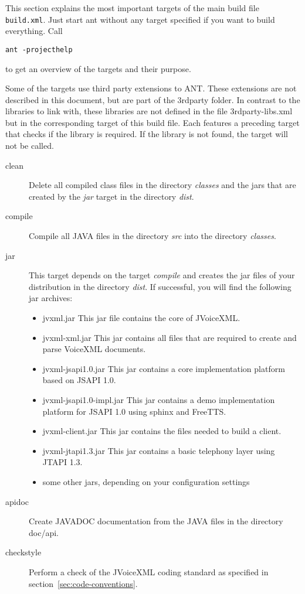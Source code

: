 \documentclass[11pt,a4paper]{article}
\begin{document}
This section explains the most important targets of the main build file
\texttt{build.xml}. Just start ant without any target specified if you want to
build everything. Call 
\begin{lstlisting}
ant -projecthelp
\end{lstlisting}
to get an overview of the targets and their purpose.

Some of the targets use third party extensions to ANT. These 
extensions are not described in this document, but are part of
the 3rdparty folder. In contrast to the libraries to link with,
these libraries are not defined in the file 3rdparty-libs.xml
but in the corresponding target of this build file. Each features
a preceding target that checks if the library is required. If
the library is not found, the target will not be called.

\begin{description}
\item[clean]
Delete all compiled class files in the directory \emph{classes}
and the jars that are created by the \emph{jar} target in the directory 
\emph{dist}.

\item[compile]
 Compile all JAVA files in the directory \emph{src} into the directory
\emph{classes}.

\item[jar]
 This target depends on the target \emph{compile} and creates the jar
files of your distribution in the directory \emph{dist}.
If successful, you will find the following jar archives:
\begin{itemize}
\item jvxml.jar This jar file contains the core of JVoiceXML.
\item jvxml-xml.jar This jar contains all files that are required
to create and parse VoiceXML documents.
\item jvxml-jsapi1.0.jar This jar contains a core implementation platform
based on JSAPI 1.0.
\item jvxml-jsapi1.0-impl.jar This jar contains a demo implementation
platform for JSAPI 1.0 using sphinx and FreeTTS.
\item jvxml-client.jar This jar contains the files needed to build
a client.
\item jvxml-jtapi1.3.jar This jar contains a basic telephony layer using
JTAPI 1.3.
\item some other jars, depending on your configuration settings
\end{itemize}

\item[apidoc]
Create JAVADOC documentation from the JAVA files in the directory
doc/api.
\item[checkstyle]
Perform a check of the JVoiceXML coding standard as specified 
in section~\ref{sec:code-conventions}.
\end{description}
\end{document}
